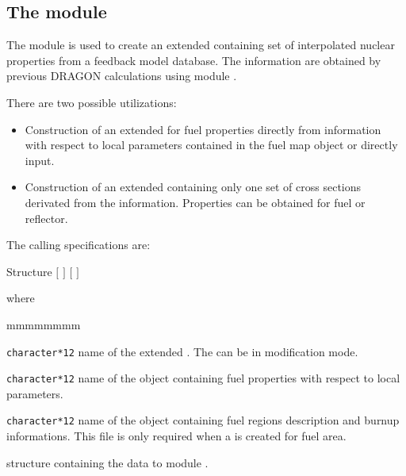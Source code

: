\subsection{The  module}

The  module is used to create an extended  
containing set of interpolated nuclear properties
from a feedback model database.\cite{sissaoui}
The  information are obtained by previous DRAGON calculations
using module .\cite{dragstruc}

There are two possible utilizations:
\begin{itemize}
\item Construction of an extended  for fuel properties 
directly from  information with respect to local parameters
contained in the fuel map object or directly input.
\item Construction of an extended  containing only one set
of cross sections derivated from the  information. 
Properties can be obtained for fuel or reflector.
\end{itemize}

The calling specifications are:

\begin{DataStructure}{Structure }
 \moc{:=}  $[$  $]$  
$[$  $]$
\moc{::} 
\end{DataStructure}

\noindent where
\begin{ListeDeDescription}{mmmmmmmm}

\item[\dusa{MACRO}] \texttt{character*12} name of 
the extended . The  can be in modification
mode.

\item[\dusa{DBASE}] \texttt{character*12} name of the 
object containing fuel properties with respect to local parameters.

\item[\dusa{MAPFL}] \texttt{character*12} name of the  
object containing fuel regions description and burnup
informations. This file is only required when a  is created
for fuel area.

\item[\dstr{descafm}] structure containing the data to module .

\end{ListeDeDescription}

